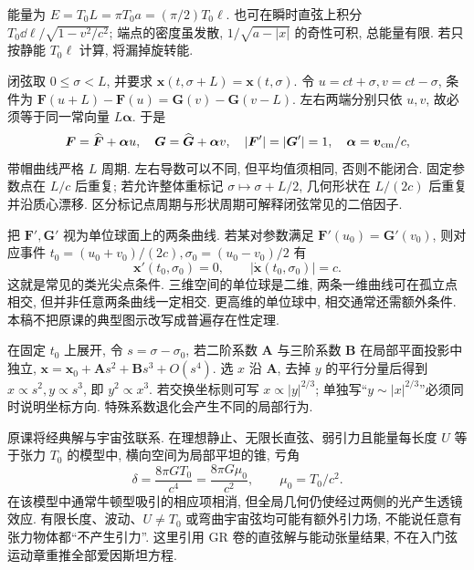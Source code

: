 能量为 $E=T_0L=\pi T_0a=(\pi/2)T_0\ell$. 也可在瞬时直弦上积分 $T_0\dd\ell/\sqrt{1-v^2/c^2}$; 端点的密度虽发散, $1/\sqrt{a-|x|}$ 的奇性可积, 总能量有限. 若只按静能 $T_0\ell$ 计算, 将漏掉旋转能.

\begin{center}
\end{center}

闭弦取 $0\leq\sigma<L$, 并要求 $\boldsymbol x(t,\sigma+L)=\boldsymbol x(t,\sigma)$. 令 $u=ct+\sigma,v=ct-\sigma$, 条件为
$\boldsymbol F(u+L)-\boldsymbol F(u)=\boldsymbol G(v)-\boldsymbol G(v-L)$.
左右两端分别只依 $u,v$, 故必须等于同一常向量 $L\boldsymbol\alpha$. 于是
\[
 \boldsymbol F=\widehat{\boldsymbol F}+\boldsymbol\alpha u,
 \quad\boldsymbol G=\widehat{\boldsymbol G}+\boldsymbol\alpha v,
 \quad|\boldsymbol F'|=|\boldsymbol G'|=1,
 \quad\boldsymbol\alpha=\boldsymbol v_{\rm cm}/c,
\]
带帽曲线严格 $L$ 周期. 左右导数可以不同, 但平均值须相同, 否则不能闭合. 固定参数点在 $L/c$ 后重复; 若允许整体重标记 $\sigma\mapsto\sigma+L/2$, 几何形状在 $L/(2c)$ 后重复并沿质心漂移. 区分标记点周期与形状周期可解释闭弦常见的二倍因子.

把 $\boldsymbol F',\boldsymbol G'$ 视为单位球面上的两条曲线. 若某对参数满足 $\boldsymbol F'(u_0)=\boldsymbol G'(v_0)$, 则对应事件
$t_0=(u_0+v_0)/(2c),\sigma_0=(u_0-v_0)/2$ 有
\[
 \boldsymbol x'(t_0,\sigma_0)=0,
 \qquad|\dot{\boldsymbol x}(t_0,\sigma_0)|=c.
\]
这就是常见的类光尖点条件. 三维空间的单位球是二维, 两条一维曲线可在孤立点相交, 但并非任意两条曲线一定相交. 更高维的单位球中, 相交通常还需额外条件. 本稿不把原课的典型图示改写成普遍存在性定理.

在固定 $t_0$ 上展开, 令 $s=\sigma-\sigma_0$, 若二阶系数 $\boldsymbol A$ 与三阶系数 $\boldsymbol B$ 在局部平面投影中独立,
$\boldsymbol x=\boldsymbol x_0+\boldsymbol A s^2+\boldsymbol B s^3+O(s^4)$.
选 $x$ 沿 $\boldsymbol A$, 去掉 $y$ 的平行分量后得到 $x\propto s^2,y\propto s^3$, 即 $y^2\propto x^3$. 若交换坐标则可写 $x\propto|y|^{2/3}$; 单独写“$y\sim|x|^{2/3}$”必须同时说明坐标方向. 特殊系数退化会产生不同的局部行为.

原课将经典解与宇宙弦联系. 在理想静止、无限长直弦、弱引力且能量每长度 $U$ 等于张力 $T_0$ 的模型中, 横向空间为局部平坦的锥, 亏角
\[
 \delta=\frac{8\pi G T_0}{c^4}
 =\frac{8\pi G\mu_0}{c^2},\qquad\mu_0=T_0/c^2.
\]
在该模型中通常牛顿型吸引的相应项相消, 但全局几何仍使经过两侧的光产生透镜效应. 有限长度、波动、$U\ne T_0$ 或弯曲宇宙弦均可能有额外引力场, 不能说任意有张力物体都“不产生引力”. 这里引用 GR 卷的直弦解与能动张量结果, 不在入门弦运动章重推全部爱因斯坦方程.
